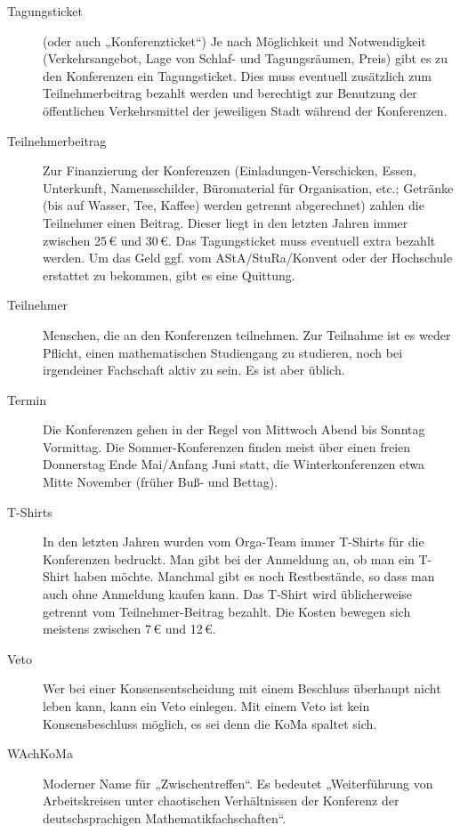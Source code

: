\documentclass{neulingsheft}
\begin{document}
{\begin{description}
\item[Tagungsticket] (oder auch „Konferenzticket“) Je nach Möglichkeit und
	Notwendigkeit (Verkehrsangebot, Lage von Schlaf- und Tagungsräumen, Preis)
	gibt es zu den Konferenzen ein Tagungsticket. Dies muss eventuell
	zusätzlich zum Teilnehmerbeitrag bezahlt werden und berechtigt zur
	Benutzung der öffentlichen Verkehrsmittel der jeweiligen Stadt während der
	Konferenzen.

\item[Teilnehmerbeitrag] Zur Finanzierung der Konferenzen
	(Einladungen-Verschicken, Essen, Unterkunft, Namensschilder, Büromaterial
	für Organisation, etc.; Getränke (bis auf Wasser, Tee, Kaffee) werden
	getrennt abgerechnet) zahlen die Teilnehmer einen Beitrag. Dieser liegt in
	den letzten Jahren immer zwischen 25\,€ und 30\,€. Das Tagungsticket muss
	eventuell extra bezahlt werden. Um das Geld ggf. vom AStA/StuRa/Konvent
	oder der Hochschule erstattet zu bekommen, gibt es eine Quittung.

\item[Teilnehmer] Menschen, die an den Konferenzen teilnehmen.  Zur Teilnahme
	ist es weder Pflicht, einen mathematischen Studiengang zu studieren, noch
	bei irgendeiner Fachschaft aktiv zu sein. Es ist aber üblich.

\item[Termin] Die Konferenzen gehen in der Regel von Mittwoch Abend bis Sonntag
	Vormittag. Die Sommer-Konferenzen finden meist über einen freien Donnerstag
	Ende Mai/Anfang Juni statt, die Winterkonferenzen etwa Mitte November
	(früher Buß- und Bettag).

\item[T-Shirts] In den letzten Jahren wurden vom Orga-Team immer T-Shirts für
	die Konferenzen bedruckt. Man gibt bei der Anmeldung an, ob man ein T-Shirt
	haben möchte. Manchmal gibt es noch Restbestände, so dass man auch ohne
	Anmeldung kaufen kann. Das T-Shirt wird üblicherweise getrennt vom
	Teilnehmer-Beitrag bezahlt. Die Kosten bewegen sich meistens zwischen 7\,€
	und 12\,€.

\item[Veto] Wer bei einer Konsensentscheidung mit einem Beschluss überhaupt
	nicht leben kann, kann ein Veto einlegen. Mit einem Veto ist kein
	Konsensbeschluss möglich, es sei denn die KoMa spaltet sich.

\item[WAchKoMa] Moderner Name für „Zwischentreffen“. Es bedeutet „Weiterführung
	von Arbeitskreisen unter chaotischen Verhältnissen der Konferenz der
	deutschsprachigen Mathematikfachschaften“.


\end{description}}
\end{document}
